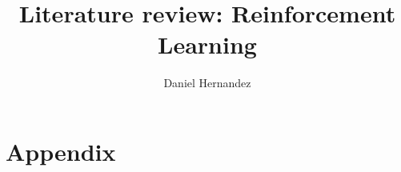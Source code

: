 \documentclass{article}
\title{\textbf{Literature review: Reinforcement Learning}}
\author{Daniel Hernandez}
\date{ }
\begin{document}
\maketitle


% 
% 
% 
% 
% 
% 
% 

\section{Appendix}


\end{document}
